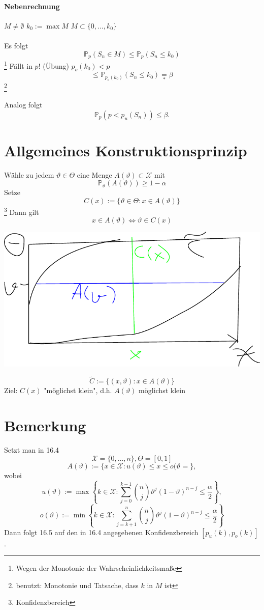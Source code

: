 \documentclass[a4paper,11pt,notitlepage]{report}
\newcommand{\Prim}{{\ensuremath{\mathbb{P}}}}
\begin{document}
\paragraph{Nebenrechnung}
$M \neq \emptyset$ \newline
$k_0 := \max M$ \newline
$M \subset \{0, \ldots, k_0\}$

\paragraph{}
Es folgt
$$\Prim_p(S_n \in M) \leq \Prim_p(S_n \leq k_0)$$ \footnote{Wegen der Monotonie der Wahrscheinlichkeitsmaße}
Fällt in $p$! (Übung)
\newline
$p_o(k_0) < p$
$$\leq \Prim_{p_o(k_0)}(S_n \leq k_0) \underset{*}{=} \beta$$ \footnote{benutzt: Monotonie und Tatsache, dass $k$ in $M$ ist}

Analog folgt
$$\Prim_p(p < p_u(S_n)) \leq \beta.$$

\section{Allgemeines Konstruktionsprinzip}
Wähle zu jedem $\vartheta \in \Theta$ eine Menge $A(\vartheta) \subset \mathcal{X}$ mit
$$\Prim_\vartheta(A(\vartheta)) \geq 1 - \alpha$$
Setze
$$C(x):= \{ \vartheta \in \Theta \colon x \in A(\vartheta)\}$$\footnote{Konfidenzbereich}
Dann gilt
$$x \in A(\vartheta) \Leftrightarrow \vartheta \in C(x)$$
\begin{center}
	\includegraphics[scale=1]{drawing.pdf}
\end{center}
$$\widetilde{C}:= \{(x, \vartheta) \colon x \in A(\vartheta)\}$$
Ziel: $C(x)$ "möglichst klein", d.h. $A(\vartheta)$ möglichst klein

\section{Bemerkung}
Setzt man in 16.4
$$\mathcal{X} = \{0, \ldots, n\}, \Theta = [0,1]$$
$$A(\vartheta) := \{x \in \mathcal{X} \colon u(\vartheta) \leq x \leq o(\vartheta= \},$$
wobei
$$u(\vartheta) := \max \left \{k \in \mathcal{X} \colon \sum\limits_{j=0}^{k-1}{{n \choose j} \vartheta^j (1-\vartheta)^{n-j} \leq \frac{\alpha}{2}} \right \},$$
$$o(\vartheta) := \min \left \{ k \in \mathcal{X} \colon \sum\limits_{j=k+1}^n{{n \choose j} \vartheta^j (1-\vartheta)^{n-j}} \leq \frac{\alpha}{2} \right \}$$
Dann folgt 16.5 auf den in 16.4 angegebenen Konfidenzbereich $[p_u(k), p_o(k)]$.
\end{document}
